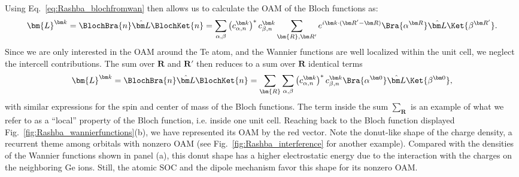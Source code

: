 Using Eq.~\eqref{eq:Rashba_blochfromwan} then allows us to calculate the OAM of the Bloch functions as:
\begin{equation}
\bm{L}^{\bm k} = \BlochBra{n} \hat{\bm L} \BlochKet{n} = \sum_{\alpha,\beta}\left(c_{\alpha,n}^{\bm k}\right)^* c_{\beta,n}^{\bm k}\sum_{\bm{R}, \bm R'}e^{i \bm k \cdot (\bm R' - \bm R)}\Bra{\alpha^{\bm R}}\hat{\bm L} \Ket{\beta^{\bm R'}}.
\end{equation}
Since we are only interested in the OAM around the Te atom, and the Wannier functions are well localized within the unit cell, we neglect the intercell contributions. The sum over $\bm R$ and $\bm R'$ then reduces to a sum over $\bm R$ identical terms
\begin{equation}
\bm{L}^{\bm k} = \BlochBra{n} \hat{\bm L} \BlochKet{n} =\sum_{\bm{R}} \sum_{\alpha,\beta}\left(c_{\alpha,n}^{\bm k}\right)^* c_{\beta,n}^{\bm k}\Bra{\alpha^{\bm 0}}\hat{\bm L} \Ket{\beta^{\bm 0}},
\end{equation}
with similar expressions for the spin and center of mass of the Bloch functions. The term inside the sum $\sum_{\bm R}$ is an example of what we refer to as a ``local'' property of the Bloch function, i.e. inside one unit cell. Reaching back to the Bloch function displayed Fig.~\ref{fig:Rashba_wannierfunctions}(b), we have represented its OAM by the red vector. Note the donut-like shape of the charge density, a recurrent theme among orbitals with nonzero OAM (see Fig.~\ref{fig:Rashba_interference} for another example). Compared with the densities of the Wannier functions shown in panel (a), this donut shape has a higher electrostatic energy due to the interaction with the charges on the neighboring Ge ions. Still, the atomic SOC and the dipole mechanism favor this shape for its nonzero OAM. 

